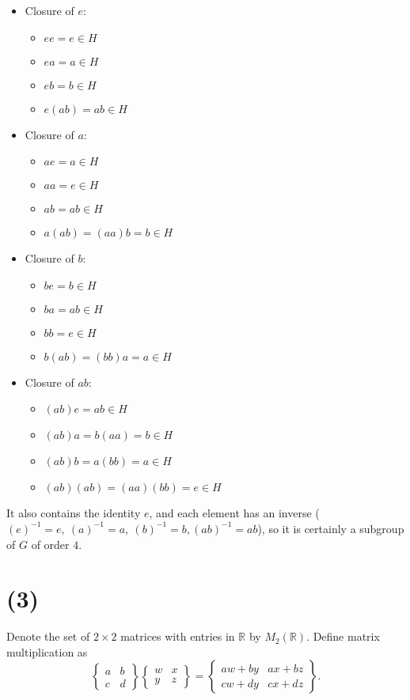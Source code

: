\documentclass[12pt,letterpaper]{article}
\begin{document}
\begin{itemize}
	\item Closure of \(e\):
	\begin{itemize}
		\item \(ee = e \in H\)
		\item \(ea = a \in H\)
		\item \(eb = b \in H\)
		\item \(e(ab) = ab \in H\)
	\end{itemize}
	\item Closure of \(a\):
	\begin{itemize}
		\item \(ae = a \in H\)
		\item \(aa = e \in H\)
		\item \(ab = ab \in H\)
		\item \(a(ab) = (aa)b = b \in H\)
	\end{itemize}
	\item Closure of \(b\):
	\begin{itemize}
		\item \(be = b \in H\)
		\item \(ba = ab \in H\)
		\item \(bb = e \in H\)
		\item \(b(ab) = (bb)a = a \in H\)
	\end{itemize}
	\item Closure of \(ab\):
	\begin{itemize}
		\item \((ab)e = ab \in H\)
		\item \((ab)a = b(aa) = b \in H\)
		\item \((ab)b = a(bb) = a \in H\)
		\item \((ab)(ab) = (aa)(bb) = e \in H\)
	\end{itemize}
\end{itemize}

It also contains the identity \(e\), and each element has an inverse (\((e)^{-1} = e,\ (a)^{-1} = a,\ (b)^{-1} = b, (ab)^{-1} = ab\)), so it is certainly a subgroup of \(G\) of order \(4\).

\section*{(3)}
Denote the set of \(2 \times 2\) matrices with entries in \(\mathbb{R}\) by \(M_{2}(\mathbb{R})\). Define matrix multiplication as \[\begin{Bmatrix} a & b \\ c & d \end{Bmatrix} \begin{Bmatrix} w & x \\ y & z \end{Bmatrix} = \begin{Bmatrix} aw + by & ax + bz \\ cw + dy & cx + dz \end{Bmatrix}.\]
\end{document}
